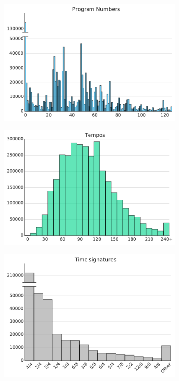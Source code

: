 \documentclass{article}
\begin{document}
\begin{figure}
    \begin{subfigure}{.23\textwidth}
        \includegraphics[width=\textwidth]{program_numbers.pdf}
    \end{subfigure}
    \begin{subfigure}{.23\textwidth}
        \includegraphics[width=\textwidth]{tempos.pdf}
    \end{subfigure}
    \begin{subfigure}{.23\textwidth}
        \includegraphics[width=\textwidth]{time_signatures.pdf}

\end{subfigure}
\end{figure}
\end{document}
